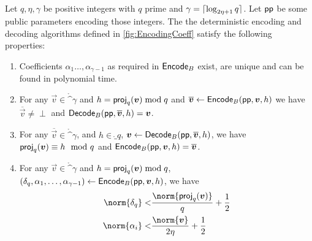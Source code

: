 \begin{lemma}\label{lem:latencode}
Let $q,\eta,\gamma$ be positive integers with $q$ prime and $\gamma = \lceil\log_{2\eta+1}q\rceil$. Let $\mathsf{pp}$ be some public parameters encoding those integers.
The the deterministic encoding and decoding algorithms defined in \autoref{fig:EncodingCoeff} satisfy the following properties:
\begin{enumerate}
 \item Coefficients $\alpha_1\ldots,\alpha_{\gamma-1}$ as required in $\mathsf{Encode}_B$ exist, are unique and can be found in polynomial time.\label{item:basis}
 \item For any $\vec{v}\in\ring^\gamma$ and $h = \mathsf{proj}_q(\boldsymbol{v})\bmod q$ and $\overline{\boldsymbol{v}} \gets \mathsf{Encode}_B(\mathsf{pp}, \boldsymbol{v}, h)$ we have\\
 $\overline{\vec{v}}\neq \perp$ and $\mathsf{Decode}_B(\mathsf{pp}, \overline{\boldsymbol{v}}, h) = \boldsymbol{v}$.\label{item:inverse1}
 \item For any $\overline{\vec{v}}\in\ring^\gamma$, and $h\in\ring_q$, $\boldsymbol{v}\gets\mathsf{Decode}_B(\mathsf{pp}, \overline{\boldsymbol{v}}, h)$, we have\\
 $\mathsf{proj}_q(\boldsymbol{v})\equiv h \mod q$ and $\mathsf{Encode}_B(\mathsf{pp}, \boldsymbol{v}, h) = \overline{\boldsymbol{v}}$.\label{item:inverse2}
 \item For any $\vec{v}\in\ring^\gamma$ and $h=\mathsf{proj}_q(\boldsymbol{v})\bmod q$, $(\delta_q,\alpha_1,\ldots,\alpha_{\gamma-1}) \gets \mathsf{Encode}_B(\mathsf{pp},\boldsymbol{v},h)$, we have
 \begin{align*}
   \norm{\delta_q} <& \frac{\norm{\proj_q(\vec{v})}}{q} + \frac{1}{2}\\
   \norm{\alpha_i} <& \frac{\norm{\vec{v}}}{2\eta} + \frac{1}{2} 
 \end{align*}\label{item:latencodebounds}
\end{enumerate}
\end{lemma}
